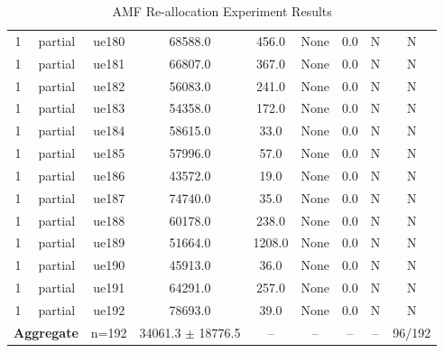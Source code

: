 \begin{table}[ht]
\begin{tabular}{|c|c|c|c|c|c|c|c|c|}
1 & partial & ue180 & 68588.0 & 456.0 & None & 0.0 & N & N \\
1 & partial & ue181 & 66807.0 & 367.0 & None & 0.0 & N & N \\
1 & partial & ue182 & 56083.0 & 241.0 & None & 0.0 & N & N \\
1 & partial & ue183 & 54358.0 & 172.0 & None & 0.0 & N & N \\
1 & partial & ue184 & 58615.0 & 33.0 & None & 0.0 & N & N \\
1 & partial & ue185 & 57996.0 & 57.0 & None & 0.0 & N & N \\
1 & partial & ue186 & 43572.0 & 19.0 & None & 0.0 & N & N \\
1 & partial & ue187 & 74740.0 & 35.0 & None & 0.0 & N & N \\
1 & partial & ue188 & 60178.0 & 238.0 & None & 0.0 & N & N \\
1 & partial & ue189 & 51664.0 & 1208.0 & None & 0.0 & N & N \\
1 & partial & ue190 & 45913.0 & 36.0 & None & 0.0 & N & N \\
1 & partial & ue191 & 64291.0 & 257.0 & None & 0.0 & N & N \\
1 & partial & ue192 & 78693.0 & 39.0 & None & 0.0 & N & N \\
\multicolumn{2}{|c|}{\textbf{Aggregate}} & n=192 & 34061.3 $\pm$ 18776.5 & -- & -- & -- & -- & 96/192 \\
\hline
\end{tabular}
\caption{AMF Re-allocation Experiment Results}
\label{tab:amf_realloc}
\end{table}
